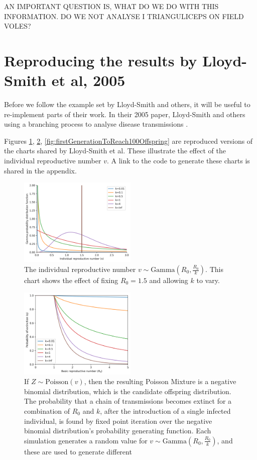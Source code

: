 \documentclass{article}
\begin{document}
AN IMPORTANT QUESTION IS, WHAT DO WE DO WITH THIS INFORMATION. DO WE NOT ANALYSE I TRIANGULICEPS ON FIELD VOLES?

\section{Reproducing the results by Lloyd-Smith et al, 2005}

Before we follow the example set by Lloyd-Smith and others, it will be useful to re-implement parts of their work. In their 2005 paper, Lloyd-Smith and others using a branching process to analyse disease transmissions \cite{LloydSmith2005}.

Figures \ref{fig:gamma(R0,R0/k)}, \ref{fig:probabilityOfExtinction}, \ref{fig:firstGenerationToReach100Offspring} are reproduced versions of the charts shared by Lloyd-Smith et al. These illustrate the effect of the individual reproductive number $ v $. A link to the code to generate these charts is shared in the appendix.

\begin{figure}[h!]
    \includegraphics[width=0.5\textwidth, center]{Images/2a_gamma.png}
    \caption{The individual reproductive number $ v \sim \text{Gamma}(R_0, \frac{R_0}{k}) $. This chart shows the effect of fixing $ R_0=1.5 $ and allowing $ k $ to vary.}
    \label{fig:gamma(R0,R0/k)}
\end{figure}

\begin{figure}[h!]
    \includegraphics[width=0.5\textwidth, center]{Images/2b_probabilityOfExtinction.png}
    \caption{If $ Z \sim \text{Poisson}(v) $, then the resulting Poisson Mixture is a negative binomial distribution, which is the candidate offspring distribution. The probability that a chain of transmissions becomes extinct for a combination of $R_0$ and $ k $, after the introduction of a single infected individual, is found by fixed point iteration over the negative binomial distribution's probability generating function. Each simulation generates a random value for $ v \sim \text{Gamma}(R_0, \frac{R_0}{k})$, and these are used to generate different }\label{fig:probabilityOfExtinction}
\end{figure}
\end{document}
